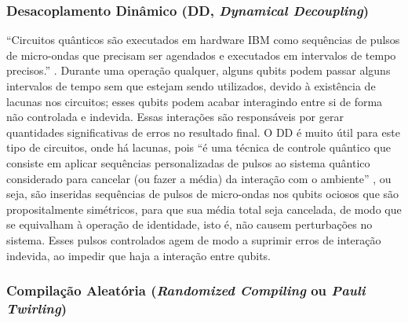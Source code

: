 \subsubsection*{Desacoplamento Din\^{a}mico (DD, \textit{Dynamical Decoupling})}
\label{subSubSec: DD}

“Circuitos qu\^{a}nticos s\~{a}o executados em hardware IBM como sequ\^{e}ncias de pulsos de micro-ondas que precisam ser agendados e executados em intervalos de tempo precisos.” \cite{IBM_DD}. Durante uma operaç\~{a}o qualquer, alguns qubits podem passar alguns intervalos de tempo sem que estejam sendo utilizados, devido à exist\^{e}ncia de lacunas nos circuitos; esses qubits podem acabar interagindo entre si de forma n\~{a}o controlada e indevida. Essas interaç\~{o}es s\~{a}o respons\'{a}veis por gerar quantidades significativas de erros no resultado final. O DD \'{e} muito \'{u}til para este tipo de circuitos, onde h\'{a} lacunas, pois “\'{e} uma t\'{e}cnica de controle qu\^{a}ntico que consiste em aplicar sequ\^{e}ncias personalizadas de pulsos ao sistema qu\^{a}ntico considerado para cancelar (ou fazer a m\'{e}dia) da interaç\~{a}o com o ambiente” \cite{lopez2023_DD}, ou seja, s\~{a}o inseridas sequ\^{e}ncias de pulsos de micro-ondas nos qubits ociosos que s\~{a}o propositalmente sim\'{e}tricos, para que sua m\'{e}dia total seja cancelada, de modo que se equivalham à operaç\~{a}o de identidade, isto \'{e}, n\~{a}o causem perturbaç\~{o}es no sistema. Esses pulsos controlados agem de modo a suprimir erros de interaç\~{a}o indevida, ao impedir que haja a interaç\~{a}o entre qubits. 

\subsubsection*{Compilaç\~{a}o Aleatória (\textit{Randomized Compiling} ou \textit{Pauli Twirling})}
\label{subSubSec: twirling}

